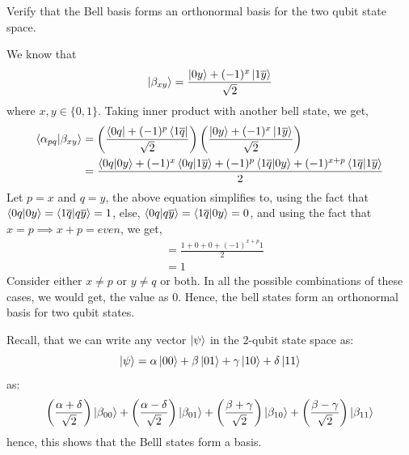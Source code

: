 \begin{example}
    Verify that the Bell basis forms an orthonormal basis for the two qubit state space.

    We know that
    \[
    \ket{\beta_{xy}}=\frac{\ket{0y}+(-1)^x \ket{1\overline{y}}}{\sqrt{2}}
    \]
    where $x,y \in \{0,1\}$. Taking inner product with another bell state, we get,
    \begin{align*}
    \braket{\alpha_{pq}|\beta_{xy}}&=\left(\frac{\bra{0q}+(-1)^p\bra{1\overline{q}}}{\sqrt{2}}\right)\left(\frac{\ket{0y}+(-1)^x\ket{1\overline{y}}}{\sqrt{2}}\right)\\
    &=\frac{\braket{0q|0y}+(-1)^x\braket{0q|1\overline{y}}+(-1)^p\braket{1\overline{q}|0y}+(-1)^{x+p}\braket{1\overline{q}|1\overline{y}}}{2}
    \end{align*}
    Let $p=x$ and $q=y$, the above equation simplifies to, using the fact that $\braket{0q|0y}=\braket{1\overline{q}|q\overline{y}}=1$, else, $\braket{0q|q\overline{y}}=\braket{1\overline{q}|0y}=0$, and using the fact that $x=p \implies x+p=even$, we get,
    \begin{align*}
    &=\frac{1+0+0+(-1)^{x+p}1}{2}\\
    &=1
    \end{align*}
    Consider either $x\neq p$ or $y\neq q$ or both. In all the possible combinations of these cases, we would get, the value as $0$. Hence, the bell states form an orthonormal basis for two qubit states.

    Recall, that we can write any vector $\ket{\psi}$ in the 2-qubit state space as:
    \[
    \ket{\psi}=\alpha\ket{00}+\beta\ket{01}+\gamma\ket{10}+\delta \ket{11}
    \]
    as:
    \[
    \left(\frac{\alpha+\delta}{\sqrt{2}}\right)\ket{\beta_{00}}+\left(\frac{\alpha-\delta}{\sqrt{2}}\right)\ket{\beta_{01}}+\left(\frac{\beta+\gamma}{\sqrt{2}}\right)\ket{\beta_{10}}+\left(\frac{\beta-\gamma}{\sqrt{2}}\right)\ket{\beta_{11}}
    \]
    hence, this shows that the Belll states form a basis.
\end{example}
